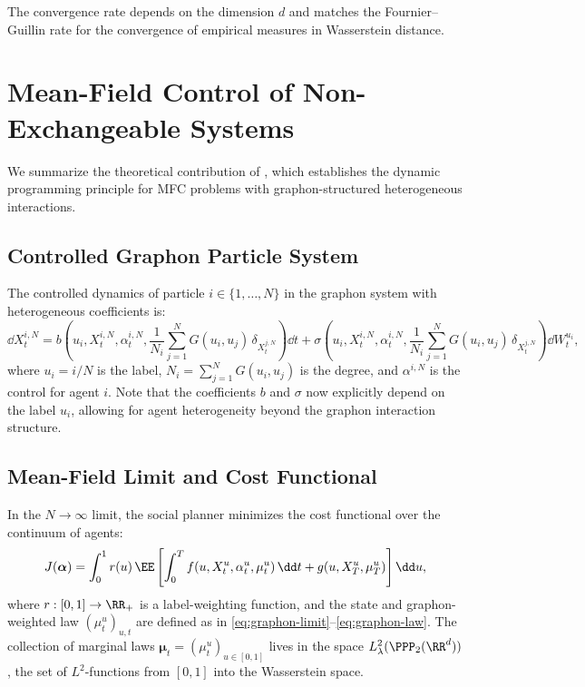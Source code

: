 \documentclass[11pt]{article}
\begin{document}
The convergence rate depends on the dimension $d$ and matches the Fournier--Guillin rate \citep{fournier2015rate} for the convergence of empirical measures in Wasserstein distance.


\section{Mean-Field Control of Non-Exchangeable Systems}\label{sec:appendix-nonexch}

We summarize the theoretical contribution of \citet{decrescenzo2025mfc}, which establishes the dynamic programming principle for MFC problems with graphon-structured heterogeneous interactions.

\subsection{Controlled Graphon Particle System}

The controlled dynamics of particle $i \in \{1, \ldots, N\}$ in the graphon system with heterogeneous coefficients is:
\begin{equation}\label{eq:nonexch-particle}
  \dd X_t^{i,N} = b\!\left(u_i, X_t^{i,N}, \alpha_t^{i,N}, \frac{1}{N_i}\sum_{j=1}^N G(u_i, u_j)\,\delta_{X_t^{j,N}}\right)\dd t + \sigma\!\left(u_i, X_t^{i,N}, \alpha_t^{i,N}, \frac{1}{N_i}\sum_{j=1}^N G(u_i, u_j)\,\delta_{X_t^{j,N}}\right)\dd W_t^{u_i},
\end{equation}
where $u_i = i/N$ is the label, $N_i = \sum_{j=1}^N G(u_i, u_j)$ is the degree, and $\alpha^{i,N}$ is the control for agent $i$. Note that the coefficients $b$ and $\sigma$ now explicitly depend on the label $u_i$, allowing for agent heterogeneity beyond the graphon interaction structure.

\subsection{Mean-Field Limit and Cost Functional}

In the $N \to \infty$ limit, the social planner minimizes the cost functional over the continuum of agents:
\begin{equation}\label{eq:nonexch-cost}
  J(\boldsymbol{\alpha}) = \int_0^1 r(u)\,\EE\left[\int_0^T f\!\left(u, X_t^u, \alpha_t^u, \mu_t^u\right)\dd t + g\!\left(u, X_T^u, \mu_T^u\right)\right]\dd u,
\end{equation}
where $r : [0,1] \to \RR_+$ is a label-weighting function, and the state and graphon-weighted law $(\mu_t^u)_{u,t}$ are defined as in \eqref{eq:graphon-limit}--\eqref{eq:graphon-law}. The collection of marginal laws $\boldsymbol{\mu}_t = (\mu_t^u)_{u \in [0,1]}$ lives in the space $L^2_\lambda(\PPP_2(\RR^d))$, the set of $L^2$-functions from $[0,1]$ into the Wasserstein space.
\end{document}
